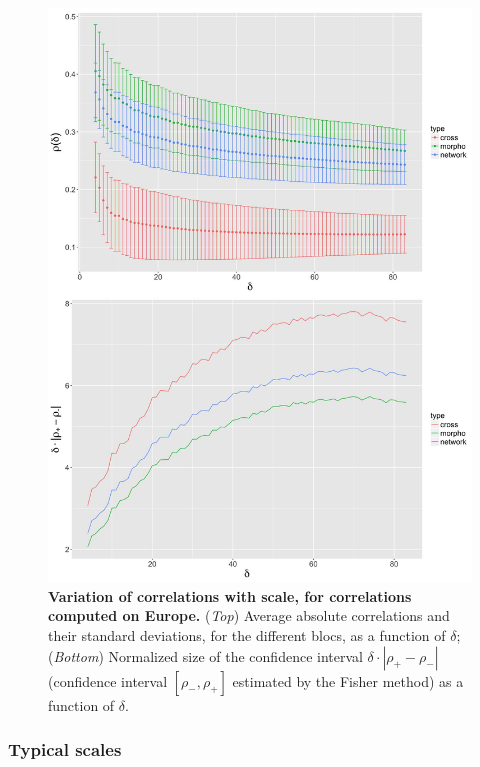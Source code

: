 \begin{figure}
\includegraphics[width=\linewidth,height=0.85\textheight]{figures/4-1-3-fig-staticcorrs-corrsdistrib}
\caption{\textbf{Variation of correlations with scale, for correlations computed on Europe.} (\textit{Top}) Average absolute correlations and their standard deviations, for the different blocs, as a function of $\delta$; (\textit{Bottom}) Normalized size of the confidence interval $\delta\cdot \left|\rho_{+} - \rho_{-}\right|$ (confidence interval $\left[\rho_{-} , \rho_{+}\right]$ estimated by the Fisher method) as a function of $\delta$.\label{fig:staticcorrs:corrsdistrib}}
\end{figure}


\subsubsection{Typical scales}


